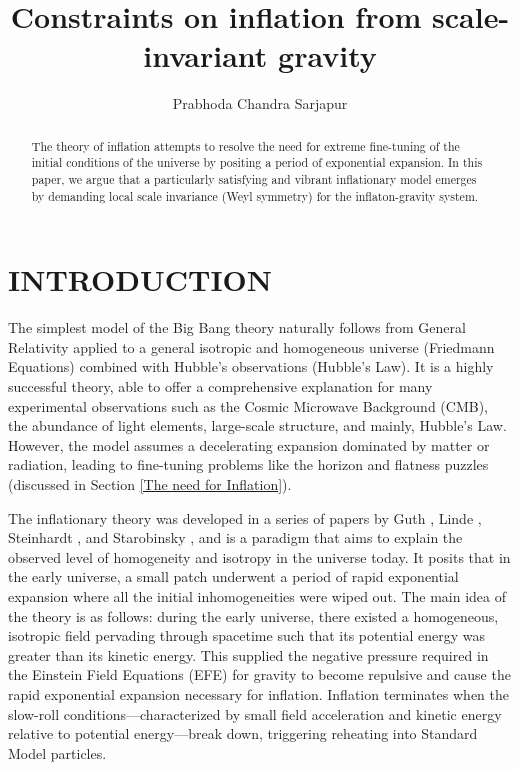 \documentclass[aps,prd,reprint,preprintnumbers,showpacs,floatfix,nofootinbib,superscript address]{revtex4-2}
\begin{document}
\title{Constraints on inflation from scale-invariant gravity}

\author{Prabhoda Chandra Sarjapur}

\begin{abstract}
The theory of inflation attempts to resolve the need for extreme fine-tuning of the initial conditions of the universe by positing a period of exponential expansion. In this paper, we argue that a particularly satisfying and vibrant inflationary model emerges by demanding local scale invariance (Weyl symmetry) for the inflaton-gravity system.

\end{abstract}

\maketitle
\section{INTRODUCTION} \label{Introduction}

\indent The simplest model of the Big Bang theory naturally follows from General Relativity applied to a general isotropic and homogeneous universe (Friedmann Equations) combined with Hubble's observations (Hubble's Law).  It is a highly successful theory, able to offer a comprehensive explanation for many experimental observations such as the Cosmic Microwave Background (CMB), the abundance of light elements, large-scale structure, and mainly, Hubble's Law. However, the model assumes a decelerating expansion dominated by matter or radiation, leading to fine-tuning problems like the horizon and flatness puzzles (discussed in Section \ref{The need for Inflation}).


The inflationary theory was developed in a series of papers by Guth \cite{GuthOriginalPaper}, Linde \cite{LINDE1982389}, Steinhardt 
\cite{PhysRevLett.48.1220}, and Starobinsky \cite{STAROBINSKY198099}, and is a paradigm that aims to explain the observed level of homogeneity and isotropy in the universe today. It posits that in the early universe, a small patch underwent a period of rapid exponential expansion where all the initial inhomogeneities were wiped out. The main idea of the theory is as follows: during the early universe, there existed a homogeneous, isotropic field pervading through spacetime such that its potential energy was greater than its kinetic energy. This supplied the negative pressure required in the Einstein Field Equations (EFE) for gravity to become repulsive and cause the rapid exponential expansion necessary for inflation. Inflation terminates when the slow-roll conditions—characterized by small field acceleration and kinetic energy relative to potential energy—break down, triggering reheating into Standard Model particles.
\end{document}
